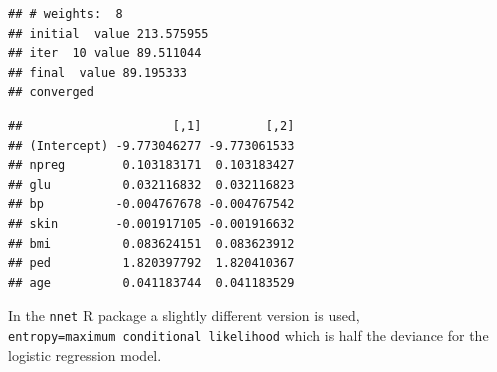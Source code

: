 \documentclass[10pt,ignorenonframetext,]{beamer}
\newenvironment{Shaded}{\begin{snugshade}}{\end{snugshade}}
\newcommand{\CommentTok}[1]{\textcolor[rgb]{0.56,0.35,0.01}{\textit{#1}}}
\newcommand{\DataTypeTok}[1]{\textcolor[rgb]{0.13,0.29,0.53}{#1}}
\newcommand{\DecValTok}[1]{\textcolor[rgb]{0.00,0.00,0.81}{#1}}
\newcommand{\FloatTok}[1]{\textcolor[rgb]{0.00,0.00,0.81}{#1}}
\newcommand{\KeywordTok}[1]{\textcolor[rgb]{0.13,0.29,0.53}{\textbf{#1}}}
\newcommand{\NormalTok}[1]{#1}
\newcommand{\OperatorTok}[1]{\textcolor[rgb]{0.81,0.36,0.00}{\textbf{#1}}}
\newcommand{\OtherTok}[1]{\textcolor[rgb]{0.56,0.35,0.01}{#1}}
\newcommand{\StringTok}[1]{\textcolor[rgb]{0.31,0.60,0.02}{#1}}
\begin{document}
\begin{frame}[fragile]

\tiny

\begin{Shaded}
\end{Shaded}

\begin{verbatim}
## # weights:  8
## initial  value 213.575955 
## iter  10 value 89.511044
## final  value 89.195333 
## converged
\end{verbatim}

\begin{Shaded}
\end{Shaded}

\begin{verbatim}
##                     [,1]         [,2]
## (Intercept) -9.773046277 -9.773061533
## npreg        0.103183171  0.103183427
## glu          0.032116832  0.032116823
## bp          -0.004767678 -0.004767542
## skin        -0.001917105 -0.001916632
## bmi          0.083624151  0.083623912
## ped          1.820397792  1.820410367
## age          0.041183744  0.041183529
\end{verbatim}

\normalsize

In the \texttt{nnet} R package a slightly different version is used,
\texttt{entropy=maximum\ conditional\ likelihood} which is half the
deviance for the logistic regression model.

\end{frame}
\end{document}
